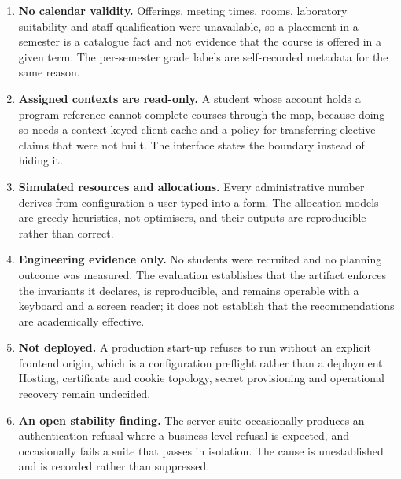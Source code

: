 \begin{enumerate}
        \textbf{Computer Engineering is imported} as a fourth structure, also at 150. Its blocks
        reconcile, and its schedule prints ten blocks while the document claims nine semesters --- a
        contradiction only if blocks are read as terms. They group courses by kind, so the ten blocks
        are ten separations rather than ten terms, and a student sequences their own plan subject to
        one constraint: the special study precedes the thesis and the thesis occupies the final
        semester alongside whatever remains. That rule, rather than the tables, determines the
        placements this manifest records, and it is stated as the rule's consequence rather than
        presented as a fact the document contains.

  \item \textbf{No calendar validity.} Offerings, meeting times, rooms, laboratory suitability and
        staff qualification were unavailable, so a placement in a semester is a catalogue fact and
        not evidence that the course is offered in a given term. The per-semester grade labels are
        self-recorded metadata for the same reason.
  \item \textbf{Assigned contexts are read-only.} A student whose account holds a program reference
        cannot complete courses through the map, because doing so needs a context-keyed client cache
        and a policy for transferring elective claims that were not built. The interface states the
        boundary instead of hiding it.
  \item \textbf{Simulated resources and allocations.} Every administrative number derives from
        configuration a user typed into a form. The allocation models are greedy heuristics, not
        optimisers, and their outputs are reproducible rather than correct.
  \item \textbf{Engineering evidence only.} No students were recruited and no planning outcome was
        measured. The evaluation establishes that the artifact enforces the invariants it declares,
        is reproducible, and remains operable with a keyboard and a screen reader; it does not
        establish that the recommendations are academically effective.
  \item \textbf{Not deployed.} A production start-up refuses to run without an explicit frontend
        origin, which is a configuration preflight rather than a deployment. Hosting, certificate
        and cookie topology, secret provisioning and operational recovery remain undecided.
  \item \textbf{An open stability finding.} The server suite occasionally produces an authentication
        refusal where a business-level refusal is expected, and occasionally fails a suite that
        passes in isolation. The cause is unestablished and is recorded rather than suppressed.
\end{enumerate}

